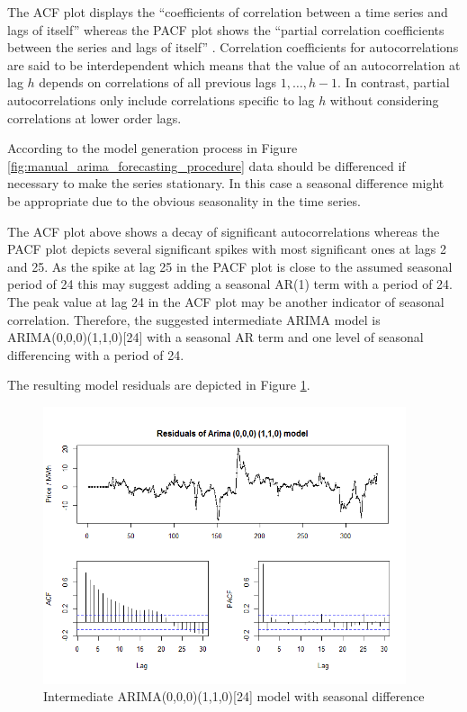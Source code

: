 The ACF plot displays the ``coefficients of correlation between a time series and lags of itself'' whereas the PACF plot shows the ``partial correlation coefficients between the series and lags of itself'' \cite{nau2016statistical}. 
Correlation coefficients for autocorrelations are said to be interdependent which means that the value of an autocorrelation at lag $h$ depends on correlations of all previous lags $1,\ldots,h-1$. In contrast, partial autocorrelations only include correlations specific to lag $h$ without considering correlations at lower order lags. 

According to the model generation process in Figure \ref{fig:manual_arima_forecasting_procedure} data should be differenced if necessary to make the series stationary. In this case a seasonal difference might be appropriate due to the obvious seasonality in the time series. 

The ACF plot above shows a decay of significant autocorrelations whereas the PACF plot depicts several significant spikes with most significant ones at lags 2 and 25. 
As the spike at lag 25 in the PACF plot is close to the assumed seasonal period of 24 this may suggest adding a seasonal AR(1) term with a period of 24. The peak value at lag 24 in the ACF plot may be another indicator of seasonal correlation.
Therefore, the suggested intermediate ARIMA model is ARIMA(0,0,0)(1,1,0)[24] with a seasonal AR term and one level of seasonal differencing with a period of 24. 

The resulting model residuals are depicted in Figure \ref{fig:residuals_arima_000_110}. 

\begin{figure}[htbp]
	\centering
		\includegraphics[width=0.95\textwidth]{figures/forecasting/residuals_arima_000_110.png}
	\caption{Intermediate ARIMA(0,0,0)(1,1,0)[24] model with seasonal difference}
	\label{fig:residuals_arima_000_110}
\end{figure}


